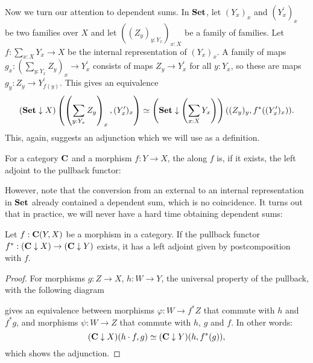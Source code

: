 Now we turn our attention to dependent sums. In $ \mathbf{Set} $, let $ (Y_x)_x $ and $ (Y^\prime_x)_x $ be two families over $ X $ and let $ ((Z_y)_{y : Y_x})_{x : X} $ be a family of families. Let $ f: \sum_{x : X} Y_x \to X $ be the internal representation of $ (Y_x)_x $. A family of maps $ g_x : (\sum_{y : Y_x} Z_y)_x \to Y^\prime_x $ consists of maps $ Z_y \to Y^\prime_x $ for all $ y : Y_x $, so these are maps $ g_y : Z_y \to Y^\prime_{f(y)} $. This gives an equivalence
\[ (\mathbf{Set} \downarrow X)\left(\left( \sum_{y : Y_x} Z_y \right)_x, (Y^\prime_x)_x \right) \simeq \left(\mathbf{Set} \downarrow \left(\sum_{x : X} Y_x \right) \right)((Z_y)_y, f^*((Y^\prime_x)_x)). \]
This, again, suggests an adjunction which we will use as a definition.
\begin{definition}
  For a category $ \mathbf{C} $ and a morphism $ f: Y \to X $, the  along $ f $ is, if it exists, the left adjoint to the pullback functor:
  \begin{center}
  \end{center}
\end{definition}

However, note that the conversion from an external to an internal representation in $ \mathbf{Set} $ already contained a dependent sum, which is no coincidence. It turns out that in practice, we will never have a hard time obtaining dependent sums:
\begin{lemma}\label{lem:sum-postcomposition}
  Let $ f : \mathbf{C}(Y, X) $ be a morphism in a category. If the pullback functor $ f^*: (\mathbf{C} \downarrow X) \to (\mathbf{C} \downarrow Y) $ exists, it has a left adjoint given by postcomposition with $ f $.
\end{lemma}
\begin{proof}
  For morphisms $ g: Z \to X $, $ h: W \to Y $, the universal property of the pullback, with the following diagram
  \begin{center}
  \end{center}
  gives an equivalence between morphisms $ \varphi: W \to f^* Z $ that commute with $ h $ and $ f^* g $, and morphisms $ \psi: W \to Z $ that commute with $ h $, $ g $ and $ f $. In other words:
  \[ (\mathbf{C} \downarrow X)(h \cdot f, g) \simeq (\mathbf{C} \downarrow Y)(h, f^*(g)), \]
  which shows the adjunction.
\end{proof}

